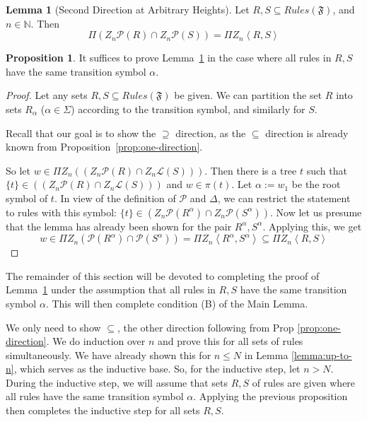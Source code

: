 \documentclass[sigplan,9pt]{acmart}\settopmatter{printfolios=true,printccs=false,printacmref=false}
\newcounter{thm}
\newcounter{theorem}
\theoremstyle{definition}
\newtheorem{prop}[thm]{Proposition}
\newtheorem{llemma}[thm]{Lemma}
\newcommand{\N}[0]{{\mathbb{N}}}
\newcommand{\La}[0]{{\mathcal{L}}}
\newcommand{\Ff}[0]{{\mathfrak{F}}}
\newcommand{\Pa}[0]{{\mathcal{P}}}
\newcommand{\Pirn}[0]{\Pi Z_n}
\newcommand{\Rn}[0]{Z_n}
\begin{document}
\begin{llemma}[Second Direction at Arbitrary Heights]\label{main-lemma-final}
Let $R,S \subseteq Rules(\Ff)$, and $n \in \N$. Then
$$\Pi \left(\Rn\Pa(R) \cap \Rn\Pa(S)\right) = \Pi \Rn\left\langle R, S\right\rangle$$
\end{llemma}



\begin{prop}
It suffices to prove Lemma~\ref{main-lemma-final} in the case where all rules in $R, S$ have the same transition symbol $\alpha$.
\end{prop}

\begin{proof}
Let any sets $R, S \subseteq Rules(\Ff)$ be given.
We can partition the set $R$ into sets $R_\alpha$ ($\alpha \in \Sigma$) according to the transition symbol, and similarly for $S$.


Recall that our goal is to show the $\supseteq$ direction, 
as the $\subseteq$ direction is already known from Proposition~\ref{prop:one-direction}.

So let $w \in \Pirn \left(\left(\Rn\Pa\left(R\right) \cap \Rn\La\left(S\right)\right)\right)$.
Then there is a tree $t$ such that $\{t\} \in \left(\left(\Rn\Pa\left(R\right) \cap \Rn\La\left(S\right)\right)\right)$  and $w \in \pi(t)$.
Let $\alpha := w_1$ be the root symbol of $t$.
In view of the definition of $\Pa$ and $\Delta$, we can restrict the statement to rules with this symbol: $\{t\} \in \left(\Rn\Pa(R^\alpha) \cap \Rn\Pa\left(S^\alpha\right)\right)$.
Now let us presume that the lemma has already been shown for the pair $R^\alpha, S^\alpha$.
Applying this, we get
$$w \in \Pirn \left(\Pa\left(R^\alpha\right) \cap \Pa\left(S^\alpha\right)\right) = \Pirn \left\langle R^\alpha, S^\alpha \right\rangle \subseteq \Pirn \left\langle R, S \right\rangle$$
\end{proof}



The remainder of this section will be devoted to completing the proof of Lemma~\ref{main-lemma-final} under the assumption that all rules in $R, S$ have the same transition symbol $\alpha$. This will then complete condition (B) of the Main Lemma.

We only need to show $\subseteq$, the other direction following from Prop \ref{prop:one-direction}.
We do induction over $n$ and prove this for all sets of rules simultaneously. We have already shown this for $n \leq N$ in Lemma \ref{lemma:up-to-n}, which serves as the inductive base.
So, for the inductive step, let $n > N$.
During the inductive step, we will assume that sets $R, S$ of rules are given where all rules have the same transition symbol $\alpha$.
Applying the previous proposition then completes the inductive step for all sets $R, S$.
\end{document}
